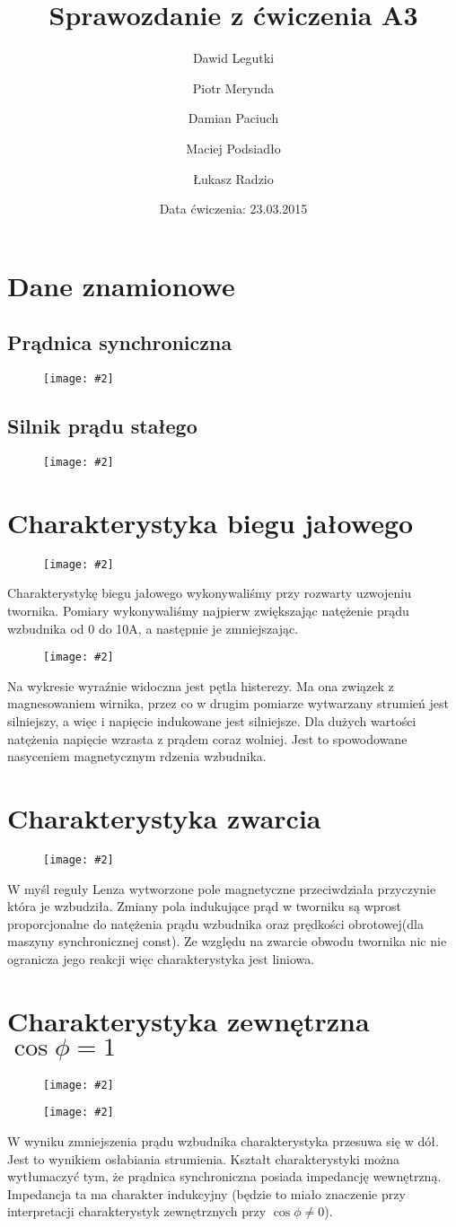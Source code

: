 \documentclass[12pt]{article}
\title{Sprawozdanie z ćwiczenia A3}
\author{ 
Dawid Legutki \and Piotr Merynda \and Damian Paciuch \and Maciej Podsiadło \and Łukasz Radzio}
\date{Data ćwiczenia: 23.03.2015}
\newcommand{\obrazek}[2]
{
	\begin{figure}[H]
	\centering
	\texttt{[image: \#2]}
	\end{figure}
}
\begin{document}
\maketitle
\section{Dane znamionowe}
\subsection{Prądnica synchroniczna}
	\obrazek{8}{tabele/pradnica}
	\subsection{Silnik prądu stałego}
	\obrazek{8}{tabele/silnik}
\section{Charakterystyka biegu jałowego}
	\obrazek{5}{tabele/jalowy}
Charakterystykę biegu jałowego wykonywaliśmy przy rozwarty uzwojeniu twornika. Pomiary wykonywaliśmy najpierw zwiększając natężenie prądu wzbudnika od 0 do 10A, a następnie je zmniejszając.
	\obrazek{12}{wykresy/jalowy}
Na wykresie wyraźnie widoczna jest pętla histerezy. Ma ona związek z magnesowaniem wirnika, przez co w drugim pomiarze wytwarzany strumień jest silniejszy, a więc i napięcie indukowane jest silniejsze. 
Dla dużych wartości natężenia napięcie wzrasta z prądem coraz wolniej. Jest to spowodowane nasyceniem magnetycznym rdzenia wzbudnika.

\section{Charakterystyka zwarcia}
	\obrazek{12}{wykresy/zwarcie}
	W myśl reguły Lenza wytworzone pole magnetyczne przeciwdziała przyczynie która je wzbudziła. Zmiany pola indukujące prąd w tworniku są wprost proporcjonalne do natężenia prądu wzbudnika oraz prędkości obrotowej(dla maszyny synchronicznej const). Ze względu na zwarcie obwodu twornika nic nie ogranicza jego reakcji więc charakterystyka jest liniowa.
	
\section{Charakterystyka zewnętrzna $\cos\phi=1$}
	\obrazek{8}{tabele/cosfi1}
	\obrazek{12}{wykresy/cosfi1} 
W wyniku zmniejszenia prądu wzbudnika charakterystyka przesuwa się w dół. Jest to wynikiem osłabiania strumienia.
Kształt charakterystyki można wytłumaczyć tym, że prądnica synchroniczna posiada impedancję wewnętrzną. Impedancja ta ma charakter indukcyjny (będzie to miało znaczenie przy interpretacji charakterystyk zewnętrznych przy $\cos \phi \neq 0$).
\end{document}
